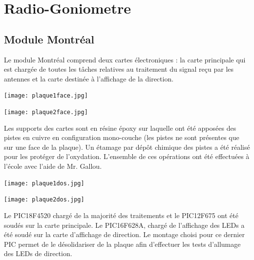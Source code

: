 
\chapter{Radio-Goniometre}

 
\section{Module Montréal}

Le module Montréal comprend deux cartes électroniques : la carte principale qui est chargée de toutes les tâches relatives au traitement du signal reçu par les antennes et la carte destinée à l'affichage de la direction.
~\\

\begin{minipage}{0.45\linewidth}

  \centering
  \texttt{[image: plaque1face.jpg]}
  ~\\
\end{minipage}
\begin{minipage}{0.45\linewidth}
	  \centering
  \texttt{[image: plaque2face.jpg]}
  ~\\
\end{minipage}


Les supports des cartes sont en résine époxy sur laquelle ont été apposées des pistes en cuivre en configuration mono-couche (les pistes ne sont présentes que sur une face de la plaque). Un étamage par dépôt chimique des pistes a été réalisé pour les protéger de l'oxydation. L'ensemble de ces opérations ont été effectuées à l'école avec l'aide de Mr. Gallou.
~\\
\begin{minipage}{0.45\linewidth}

  \centering
  \texttt{[image: plaque1dos.jpg]}
  ~\\
\end{minipage}
\begin{minipage}{0.45\linewidth}
	  \centering
  \texttt{[image: plaque2dos.jpg]}
  ~\\
\end{minipage}
 
Le PIC18F4520 chargé de la majorité des traitements et le PIC12F675 ont été soudés sur la carte principale. Le PIC16F628A, chargé de l'affichage des LEDs a été soudé sur la carte d'affichage de direction. Le montage choisi pour ce dernier PIC permet de le désolidariser de la plaque afin d'effectuer les tests d'allumage des LEDs de direction.

